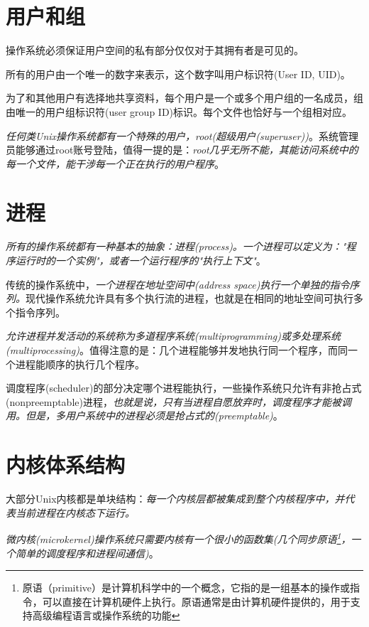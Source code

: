 \section{用户和组}

    操作系统必须保证用户空间的私有部分仅仅对于其拥有者是可见的。

    所有的用户由一个唯一的数字来表示，这个数字叫用户标识符(User ID, UID)。

    为了和其他用户有选择地共享资料，每个用户是一个或多个用户组的一名成员，组由唯一的用户组标识符(user group ID)标识。每个文件也恰好与一个组相对应。

    \emph{任何类Unix操作系统都有一个特殊的用户，root(超级用户(superuser))}。系统管理员能够通过root账号登陆，值得一提的是：\emph{root几乎无所不能，其能访问系统中的每一个文件，能干涉每一个正在执行的用户程序}。

\section{进程}

    \emph{所有的操作系统都有一种基本的抽象：进程(process)。一个进程可以定义为："程序运行时的一个实例"，或者一个运行程序的"执行上下文"}。

    传统的操作系统中，\emph{一个进程在地址空间中(address space)执行一个单独的指令序列。}现代操作系统允许具有多个执行流的进程，也就是在相同的地址空间可执行多个指令序列。

    \emph{允许进程并发活动的系统称为多道程序系统(multiprogramming)或多处理系统(multiprocessing)}。值得注意的是：几个进程能够并发地执行同一个程序，而同一个进程能顺序的执行几个程序。

    调度程序(scheduler)的部分决定哪个进程能执行，一些操作系统只允许有非抢占式(nonpreemptable)进程，\emph{也就是说，只有当进程自愿放弃时，调度程序才能被调用。但是，多用户系统中的进程必须是抢占式的(preemptable)}。

\section{内核体系结构}

    大部分Unix内核都是单块结构：\emph{每一个内核层都被集成到整个内核程序中，并代表当前进程在内核态下运行。}

    \emph{微内核(microkernel)操作系统只需要内核有一个很小的函数集(几个同步原语\footnote[1]{原语（primitive）是计算机科学中的一个概念，它指的是一组基本的操作或指令，可以直接在计算机硬件上执行。原语通常是由计算机硬件提供的，用于支持高级编程语言或操作系统的功能}，一个简单的调度程序和进程间通信)}。


